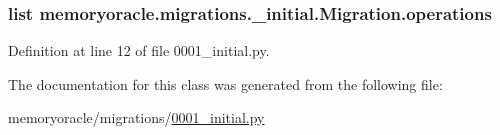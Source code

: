\subsubsection[{operations}]{\setlength{\rightskip}{0pt plus 5cm}list memoryoracle.\+migrations.\+\_\+initial.\+Migration.\+operations\hspace{0.3cm}{\ttfamily [static]}}\label{classmemoryoracle_1_1migrations_1_10001__initial_1_1Migration_a4463b1b5eba273e3ad8c7a9c48453262}


Definition at line 12 of file 0001\+\_\+initial.\+py.



The documentation for this class was generated from the following file\+:\begin{DoxyCompactItemize}
\item 
memoryoracle/migrations/\hyperlink{0001__initial_8py}{0001\+\_\+initial.\+py}\end{DoxyCompactItemize}
